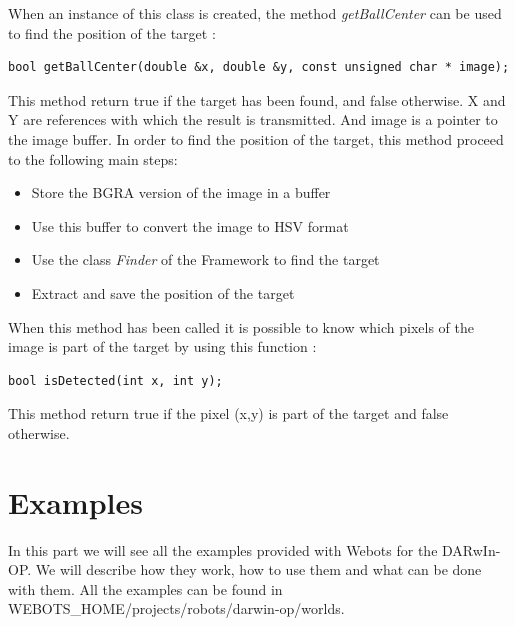 \documentclass[a4paper, 12pt]{article}  		%
\begin{document}
\newpage
When an instance of this class is created, the method \textit{getBallCenter} can be used to find the position of the target :\\

\lstset{language=c++} 
\lstset{commentstyle=\textit} 
\begin{lstlisting} 
bool getBallCenter(double &x, double &y, const unsigned char * image);
\end{lstlisting}
 
This method return true if the target has been found, and false otherwise. X and Y are references with which the result is transmitted. And image is a pointer to the image buffer. In order to find the position of the target, this method proceed to the following main steps:\\
\begin{itemize}
\item Store the BGRA version  of the image in a buffer
\item Use this buffer to convert the image to HSV format
\item Use the class \textit{Finder} of the Framework to find the target
\item Extract and save the position of the target
\end{itemize}

When this method has been called it is possible to know which pixels of the image is part of the target by using this function :\\

\lstset{language=c++} 
\lstset{commentstyle=\textit} 
\begin{lstlisting} 
bool isDetected(int x, int y);
\end{lstlisting}

This method return true if the pixel (x,y) is part of the target and false otherwise.\\



\newpage
\section{Examples}

In this part we will see all the examples provided with Webots for the DARwIn-OP. We will describe how they work, how to use them and what can be done with them. All the examples can be found in WEBOTS\_HOME/projects/robots/darwin-op/worlds.\\
\end{document}
